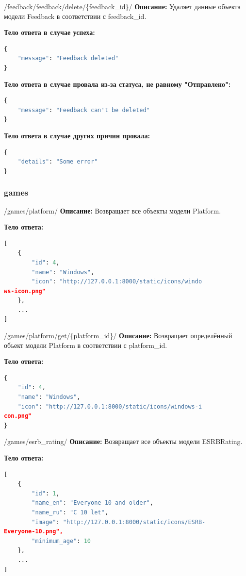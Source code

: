 \documentclass[a4paper,14pt]{extarticle}
\begin{document}
	\begin{deleteapi}{/feedback/feedback/delete/\{feedback\_id\}/}
		\textbf{Описание:} Удаляет данные объекта модели Feedback в соответствии с feedback\_id.\medskip
		
		\textbf{Тело ответа в случае успеха:}
		\begin{lstlisting}[language=Python]
{
    "message": "Feedback deleted"
}
		\end{lstlisting}
		
		\textbf{Тело ответа в случае провала из-за статуса, не равному "Отправлено":}
		\begin{lstlisting}[language=Python]
{
    "message": "Feedback can't be deleted"
}
		\end{lstlisting}
		
		\textbf{Тело ответа в случае других причин провала:}
		\begin{lstlisting}[language=Python]
{
    "details": "Some error"
}
		\end{lstlisting}
	\end{deleteapi}
	
	\subsubsection{games}
	\begin{getapi}{/games/platform/}
		\textbf{Описание:} Возвращает все объекты модели Platform.\medskip
		
		\textbf{Тело ответа:}
		\begin{lstlisting}[language=Python]
[
    {
        "id": 4,
        "name": "Windows",
        "icon": "http://127.0.0.1:8000/static/icons/windo
ws-icon.png"
    },
    ...
]
		\end{lstlisting}
	\end{getapi}
	
	\begin{getapi}{/games/platform/get/\{platform\_id\}/}
		\textbf{Описание:} Возвращает определённый объект модели Platform в соответствии с platform\_id.\medskip
		
		\textbf{Тело ответа:}
		\begin{lstlisting}[language=Python]
{
    "id": 4,
    "name": "Windows",
    "icon": "http://127.0.0.1:8000/static/icons/windows-i
con.png"
}
		\end{lstlisting}
	\end{getapi}
	
	\begin{getapi}{/games/esrb\_rating/}
		\textbf{Описание:} Возвращает все объекты модели ESRBRating.\medskip
		
		\textbf{Тело ответа:}
		\begin{lstlisting}[language=Python]
[
    {
        "id": 1,
        "name_en": "Everyone 10 and older",
        "name_ru": "C 10 let",
        "image": "http://127.0.0.1:8000/static/icons/ESRB-
Everyone-10.png",
        "minimum_age": 10
    },
    ...
]
		\end{lstlisting}
	\end{getapi}
	
\end{document}
